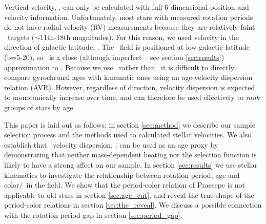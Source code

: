 Vertical velocity, \vz, can only be calculated with full 6-dimensional
position and velocity information.
Unfortunately, most stars with measured rotation periods do not have radial
velocity (RV) measurements because they are relatively faint \kepler\ targets
($\sim$11th-18th magnitudes).
For this reason, we used velocity in the direction of galactic latitude, \vb.
The \kepler\ field is positioned at low galactic latitude (b=5-20\degrees), so
\vb\ is a close (although imperfect -- see section \ref{sec:results})
approximation to \vz.
Because we use \vb\ rather than \vz\, it is difficult to directly compare
gyrochronal ages with kinematic ones using an age-velocity dispersion relation
(AVR).
However, regardless of direction, velocity dispersion is expected to
monotonically increase over time, and can therefore be used effectively to
{\it rank} groups of stars by age.

This paper is laid out as follows: in section \ref{sec:method} we describe our
sample selection process and the methods used to calculated stellar
velocities.
We also establish that \vb\ velocity dispersion, \sigmavb, can be used as an
age proxy by demonstrating that neither mass-dependent heating nor the
selection function is likely to have a strong affect on our sample.
In section \ref{sec:results} we use stellar kinematics to investigate the
relationship between rotation period, age and color/\teff\ in the field.
We show that the period-color relation of Praesepe is not applicable to
old stars in section \ref{sec:age_cut}, and reveal the true shape of the
period-color relations in section \ref{sec:the_reveal}.
We discuss a possible connection with the rotation period gap in section
\ref{sec:period_gap}.
